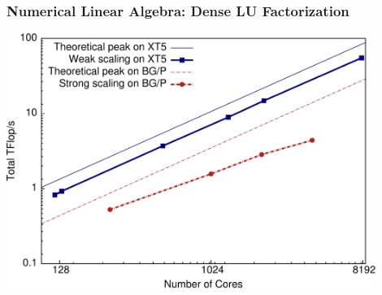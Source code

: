 \begin{frame}
\frametitle{Numerical Linear Algebra: Dense LU Factorization}
\begin{center}
\includegraphics[width=0.9\textwidth]{../figures/charmlu_scaling.pdf}
\end{center}
\end{frame}

